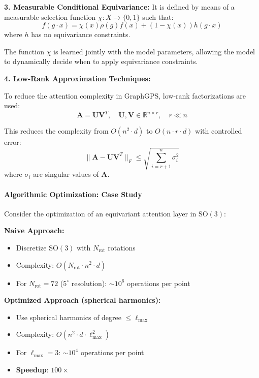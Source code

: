 \textbf{3. Measurable Conditional Equivariance:} It is defined by means of a measurable selection function $\chi: X \to \{0,1\}$ such that:
\begin{equation}
f(g \cdot x) = \chi(x) \rho(g)f(x) + (1-\chi(x))h(g \cdot x)
\end{equation}
where $h$ has no equivariance constraints.

The function $\chi$ is learned jointly with the model parameters, allowing the model to dynamically decide when to apply equivariance constraints.

\textbf{4. Low-Rank Approximation Techniques:}

To reduce the attention complexity in GraphGPS, low-rank factorizations are used:
\begin{equation}
\mathbf{A} = \mathbf{U} \mathbf{V}^T, \quad \mathbf{U}, \mathbf{V} \in \mathbb{R}^{n \times r}, \quad r \ll n
\end{equation}

This reduces the complexity from $O(n^2 \cdot d)$ to $O(n \cdot r \cdot d)$ with controlled error:
\begin{equation}
\|\mathbf{A} - \mathbf{U}\mathbf{V}^T\|_F \leq \sqrt{\sum_{i=r+1}^n \sigma_i^2}
\end{equation}
where $\sigma_i$ are singular values of $\mathbf{A}$.

\paragraph{Algorithmic Optimization: Case Study}

Consider the optimization of an equivariant attention layer in $\text{SO}(3)$:

\textbf{Naive Approach:}
\begin{itemize}
\item Discretize $\text{SO}(3)$ with $N_{\text{rot}}$ rotations
\item Complexity: $O(N_{\text{rot}} \cdot n^2 \cdot d)$
\item For $N_{\text{rot}} = 72$ ($5^\circ$ resolution): $\sim 10^6$ operations per point
\end{itemize}

\textbf{Optimized Approach (spherical harmonics):}
\begin{itemize}
\item Use spherical harmonics of degree $\leq \ell_{\max}$
\item Complexity: $O(n^2 \cdot d \cdot \ell_{\max}^2)$
\item For $\ell_{\max} = 3$: $\sim 10^4$ operations per point
\item \textbf{Speedup}: $100\times$
\end{itemize}

